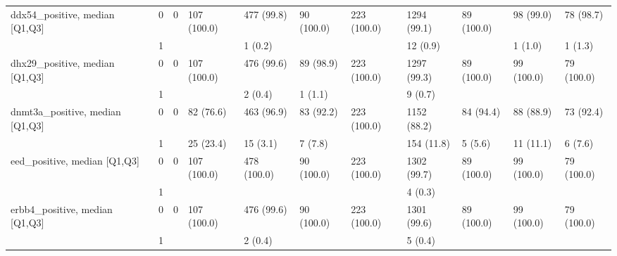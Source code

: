 \begin{tabular}{lllllllllll}
ddx54\_positive, median [Q1,Q3] & 0 &                    0 &         107 (100.0) &         477 (99.8) &           90 (100.0) &         223 (100.0) &       1294 (99.1) &        89 (100.0) &           98 (99.0) &            78 (98.7) \\
                 & 1 &                      &                     &            1 (0.2) &                      &                     &          12 (0.9) &                   &             1 (1.0) &              1 (1.3) \\
dhx29\_positive, median [Q1,Q3] & 0 &                    0 &         107 (100.0) &         476 (99.6) &            89 (98.9) &         223 (100.0) &       1297 (99.3) &        89 (100.0) &          99 (100.0) &           79 (100.0) \\
                 & 1 &                      &                     &            2 (0.4) &              1 (1.1) &                     &           9 (0.7) &                   &                     &                      \\
dnmt3a\_positive, median [Q1,Q3] & 0 &                    0 &           82 (76.6) &         463 (96.9) &            83 (92.2) &         223 (100.0) &       1152 (88.2) &         84 (94.4) &           88 (88.9) &            73 (92.4) \\
                 & 1 &                      &           25 (23.4) &           15 (3.1) &              7 (7.8) &                     &        154 (11.8) &           5 (5.6) &           11 (11.1) &              6 (7.6) \\
eed\_positive, median [Q1,Q3] & 0 &                    0 &         107 (100.0) &        478 (100.0) &           90 (100.0) &         223 (100.0) &       1302 (99.7) &        89 (100.0) &          99 (100.0) &           79 (100.0) \\
                 & 1 &                      &                     &                    &                      &                     &           4 (0.3) &                   &                     &                      \\
erbb4\_positive, median [Q1,Q3] & 0 &                    0 &         107 (100.0) &         476 (99.6) &           90 (100.0) &         223 (100.0) &       1301 (99.6) &        89 (100.0) &          99 (100.0) &           79 (100.0) \\
                 & 1 &                      &                     &            2 (0.4) &                      &                     &           5 (0.4) &                   &                     &                      \\

\end{tabular}
